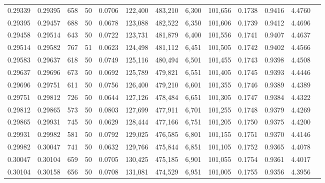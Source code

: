\begin{tabular}{rrrrrrrrrrrrr}
0.29339 & 0.29395 &   658 &  50 &                                     0.0706 & 122,400 & 483,210 &   6,300 & 101,656 & 0.1738 & 0.9416 & 4.4760 \\
0.29395 & 0.29457 &   688 &  50 &                                     0.0678 & 123,088 & 482,522 &   6,350 & 101,606 & 0.1739 & 0.9412 & 4.4696 \\
0.29458 & 0.29514 &   643 &  50 &                                     0.0722 & 123,731 & 481,879 &   6,400 & 101,556 & 0.1741 & 0.9407 & 4.4637 \\
0.29514 & 0.29582 &   767 &  51 &                                     0.0623 & 124,498 & 481,112 &   6,451 & 101,505 & 0.1742 & 0.9402 & 4.4566 \\
0.29583 & 0.29637 &   618 &  50 &                                     0.0749 & 125,116 & 480,494 &   6,501 & 101,455 & 0.1743 & 0.9398 & 4.4508 \\
0.29637 & 0.29696 &   673 &  50 &                                     0.0692 & 125,789 & 479,821 &   6,551 & 101,405 & 0.1745 & 0.9393 & 4.4446 \\
0.29696 & 0.29751 &   611 &  50 &                                     0.0756 & 126,400 & 479,210 &   6,601 & 101,355 & 0.1746 & 0.9389 & 4.4389 \\
0.29751 & 0.29812 &   726 &  50 &                                     0.0644 & 127,126 & 478,484 &   6,651 & 101,305 & 0.1747 & 0.9384 & 4.4322 \\
0.29812 & 0.29865 &   573 &  50 &                                     0.0803 & 127,699 & 477,911 &   6,701 & 101,255 & 0.1748 & 0.9379 & 4.4269 \\
0.29865 & 0.29931 &   745 &  50 &                                     0.0629 & 128,444 & 477,166 &   6,751 & 101,205 & 0.1750 & 0.9375 & 4.4200 \\
0.29931 & 0.29982 &   581 &  50 &                                     0.0792 & 129,025 & 476,585 &   6,801 & 101,155 & 0.1751 & 0.9370 & 4.4146 \\
0.29982 & 0.30047 &   741 &  50 &                                     0.0632 & 129,766 & 475,844 &   6,851 & 101,105 & 0.1752 & 0.9365 & 4.4078 \\
0.30047 & 0.30104 &   659 &  50 &                                     0.0705 & 130,425 & 475,185 &   6,901 & 101,055 & 0.1754 & 0.9361 & 4.4017 \\
0.30104 & 0.30158 &   656 &  50 &                                     0.0708 & 131,081 & 474,529 &   6,951 & 101,005 & 0.1755 & 0.9356 & 4.3956 \\

\end{tabular}
